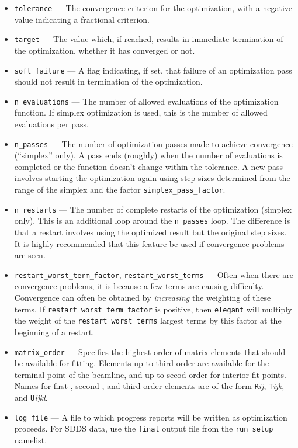 \documentclass[11pt]{article}
\begin{document}
\begin{itemize}
\item \verb|tolerance| --- The convergence criterion for the optimization, with a negative value indicating
a fractional criterion.
\item \verb|target| --- The value which, if reached, results in immediate termination of the optimization,
whether it has converged or not.
\item \verb|soft_failure| --- A flag indicating, if set, that failure of an optimization pass should not
result in termination of the optimization.

\item \verb|n_evaluations| --- The number of allowed evaluations of
the optimization function.  If simplex optimization is used, this is
the number of allowed evaluations per pass.

\item \verb|n_passes| --- The number of optimization passes made to
achieve convergence (``simplex'' only).  A pass ends (roughly) when
the number of evaluations is completed or the function doesn't change
within the tolerance.  A new pass involves starting the optimization
again using step sizes determined from the range of the simplex and
the factor \verb|simplex_pass_factor|.

\item \verb|n_restarts| --- The number of complete restarts of the
optimization (simplex only).  This is an additional loop around the
\verb|n_passes| loop.  The difference is that a restart involves using
the optimized result but the original step sizes.  It is highly
recommended that this feature be used if convergence problems are seen.

\item \verb|restart_worst_term_factor|, \verb|restart_worst_terms| --- Often
when there are convergence problems, it is because a few terms are causing 
difficulty.  Convergence can often be obtained by {\em increasing} the weighting
of these terms.  If  \verb|restart_worst_term_factor| is positive, then \verb|elegant|
will multiply the weight of the \verb|restart_worst_terms| largest terms by this
factor at the beginning of a restart.

\item \verb|matrix_order| --- Specifies the highest order of matrix elements that
should be available for fitting.  Elements up to third order are available for
the terminal point of the beamline, and up to secod order for interior fit points.
Names for first-, second-, and third-order elements are of the form
{\tt R}{\em ij}, {\tt T}{\em ijk}, and {\tt U}{\em ijkl}.
\item \verb|log_file| --- A file to which progress reports will be written as optimization proceeds.
For SDDS data, use the \verb|final| output file from the \verb|run_setup| namelist.


\end{itemize}
\end{document}
